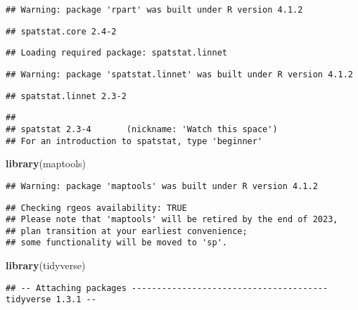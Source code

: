 \documentclass[]{article}
\newenvironment{Shaded}{\begin{snugshade}}{\end{snugshade}}
\newcommand{\KeywordTok}[1]{\textcolor[rgb]{0.13,0.29,0.53}{\textbf{#1}}}
\newcommand{\NormalTok}[1]{#1}
\begin{document}
\begin{verbatim}
## Warning: package 'rpart' was built under R version 4.1.2
\end{verbatim}

\begin{verbatim}
## spatstat.core 2.4-2
\end{verbatim}

\begin{verbatim}
## Loading required package: spatstat.linnet
\end{verbatim}

\begin{verbatim}
## Warning: package 'spatstat.linnet' was built under R version 4.1.2
\end{verbatim}

\begin{verbatim}
## spatstat.linnet 2.3-2
\end{verbatim}

\begin{verbatim}
## 
## spatstat 2.3-4       (nickname: 'Watch this space') 
## For an introduction to spatstat, type 'beginner'
\end{verbatim}

\begin{Shaded}
\begin{Highlighting}[]
\KeywordTok{library}\NormalTok{(maptools)}
\end{Highlighting}
\end{Shaded}

\begin{verbatim}
## Warning: package 'maptools' was built under R version 4.1.2
\end{verbatim}

\begin{verbatim}
## Checking rgeos availability: TRUE
## Please note that 'maptools' will be retired by the end of 2023,
## plan transition at your earliest convenience;
## some functionality will be moved to 'sp'.
\end{verbatim}

\begin{Shaded}
\begin{Highlighting}[]
\KeywordTok{library}\NormalTok{(tidyverse)}
\end{Highlighting}
\end{Shaded}

\begin{verbatim}
## -- Attaching packages --------------------------------------- tidyverse 1.3.1 --
\end{verbatim}
\end{document}
